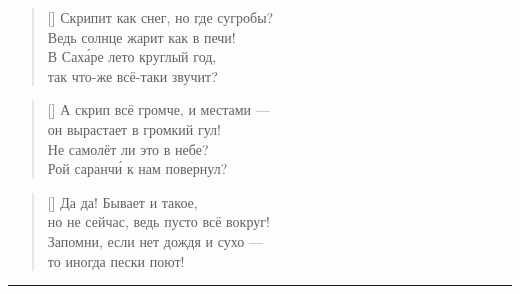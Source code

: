 \documentclass[a5paper,11pt]{memoir}
\begin{document}
\begin{verse}[\versewidth]
Скрипит как снег, но где сугробы? \\
Ведь солнце жарит как в печи! \\
В Сах\'{а}ре лето круглый год, \\
так что-же всё-таки звучит?
\end{verse}

\begin{verse}[\versewidth]
А скрип всё громче, и местами --- \\
он вырастает в громкий гул! \\
Не самолёт ли это в небе? \\
Рой саранч\'{и} к нам повернул?
\end{verse}

\begin{verse}[\versewidth]
Да да! Бывает и такое, \\
но не сейчас, ведь пусто всё вокруг! \\
Запомни, если нет дождя и сухо --- \\
то иногда пески поют!
\end{verse}
\fancybreak{***}

\BgThispage
\end{document}
